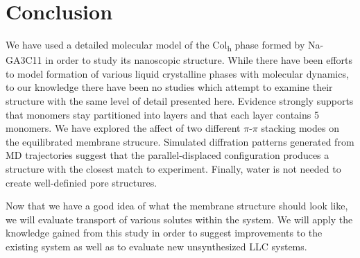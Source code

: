 \documentclass{article}
\begin{document}
  \section{Conclusion}
  
  We have used a detailed molecular model of the Col\textsubscript{h} phase
  formed by Na-GA3C11 in order to study its nanoscopic structure. While there
  have been efforts to model formation of various liquid crystalline phases with
  molecular dynamics, to our knowledge there have been no studies which attempt
  to examine their structure with the same level of detail presented here.
  Evidence strongly supports that monomers stay partitioned into layers and that
  each layer contains 5 monomers. We have explored the affect of two different
  $\pi$-$\pi$ stacking modes on the equilibrated membrane strucure. Simulated
  diffration patterns generated from MD trajectories suggest that the
  parallel-displaced configuration produces a structure with the closest match to
  experiment. Finally, water is not needed to create well-definied pore
  structures. 

  Now that we have a good idea of what the membrane structure should
  look like, we will evaluate transport of various solutes within the system. We
  will apply the knowledge gained from this study in order to suggest
  improvements to the existing system as well as to evaluate new unsynthesized
  LLC systems.

  \clearpage
  
\end{document}
